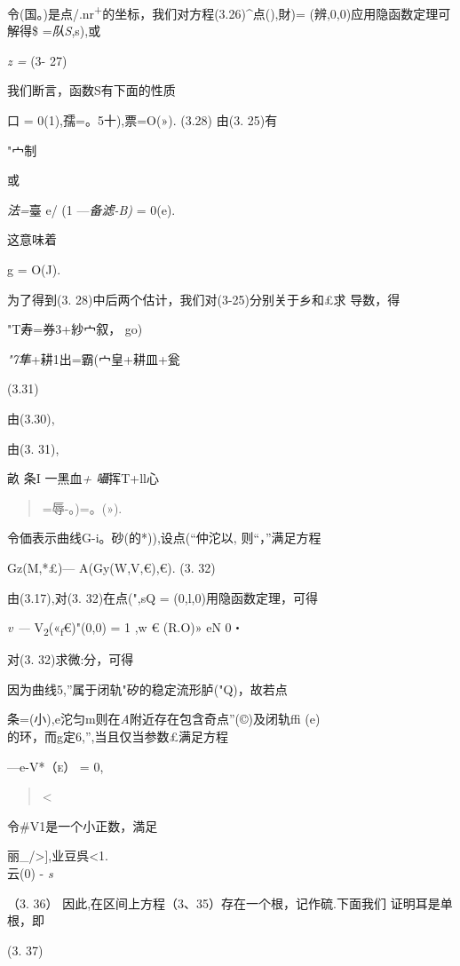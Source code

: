 \documentclass{article}
\begin{document}
令(国。)是点/.nr\textsuperscript{+}的坐标，我们对方程(3.26)\^{}点(),財)=
(辨,0,0)应用隐函数定理可解得\$ =\emph{队S},s),或

\emph{z =} (3- 27)

我们断言，函数S有下面的性质

口 = 0(1),孺=。5十),票=O(»). (3.28) 由(3. 25)有

"宀制

或

\emph{法=}臺 e/ (1 ---\emph{备滤-B)} = 0(e).

这意味着

g = O(J).

为了得到(3. 28)中后两个估计，我们对(3-25)分别关于乡和£求 导数，得

"T寿=券3+紗宀叙， go)

\emph{"7隼}+耕1出=霸(宀皇+耕皿+瓮

(3.31)

由(3.30),

由(3. 31),

畝 {条I 一黑血\emph{+ 囁}挥T+ll心}

\begin{quote}
=辱-。)=。(»).
\end{quote}

令価表示曲线G-i。砂(的*)),设点(``仲沱以, 则``，''满足方程

Gz(M,*£)--- A(Gy(W,V,€),€). (3. 32)

由(3.17),对(3. 32)在点(",sQ = (0,l,0)用隐函数定理，可得

\emph{v ---} V\textsubscript{2}(«\textsubscript{f}€)"(0,0) = 1 ,w €
(R.O)» eN 0・

对(3. 32)求微:分，可得

因为曲线5,''属于闭轨"矽的稳定流形胪("Q)，故若点

条=(小),e沱匀m则在\emph{A}附近存在包含奇点''(©)及闭轨ffi (e)\\
的环，而g定6,'',当且仅当参数£满足方程

---e-\textsc{V*（e）} = 0,

\begin{quote}
\textless{}
\end{quote}

令\#V1是一个小正数，満足

丽\_/\textgreater{}{]},业豆呉\textless{}1.\\
云(0) - \emph{s}

（3. 36） 因此,在区间上方程（3、35）存在一个根，记作硫.下面我们
证明耳是单根，即

(3. 37)
\end{document}
